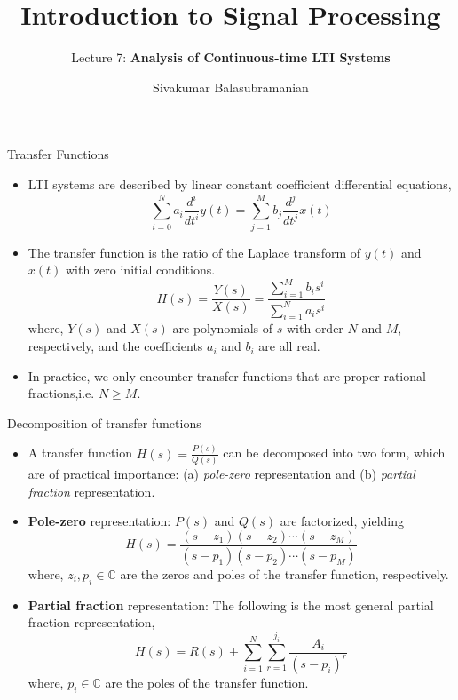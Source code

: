 \documentclass{beamer}
\title{Introduction to Signal Processing}
\subtitle{Lecture 7: \textbf{Analysis of Continuous-time LTI Systems}}
\author{Sivakumar Balasubramanian}
\institute[Christian Medical College] %
{
  \inst{}%
  Department of Bioengineering\\
  Christian Medical College, Bagayam\\
  Vellore 632002
}
\date{}
\begin{document}

\begin{frame}
  \titlepage
\end{frame}

\begin{frame}{Transfer Functions}

\begin{itemize}
\item LTI systems are described by linear constant coefficient differential equations,
\[ \sum_{i=0}^{N}a_i\frac{d^i}{dt^i}y(t) = \sum_{j=1}^{M}b_{j}\frac{d^j}{dt^j}x(t) \]
\item The transfer function is the ratio of the Laplace transform of $y(t)$ and $x(t)$ with zero initial conditions.
\[ H(s) = \frac{Y(s)}{X(s)} = \frac{\sum_{i=1}^{M}b_is^i}{\sum_{i=1}^{N}a_is^i} \]
where, $Y(s)$ and $X(s)$ are polynomials of $s$ with order $N$ and $M$, respectively, and the coefficients $a_i$ and $b_i$ are all real.
\item In practice, we only encounter transfer functions that are proper rational fractions,i.e. $N \geq M$.
\end{itemize}
\end{frame}

\begin{frame}{Decomposition of transfer functions}

\begin{itemize}
\item A transfer function $H(s)=\frac{P(s)}{Q(s)}$ can be  decomposed into two form, which are of practical importance: (a) \textit{pole-zero} representation and (b) \textit{partial fraction} representation.

\item \textbf{Pole-zero} representation: $P(s)$ and $Q(s)$ are factorized, yielding
\[ H(s) = \frac{\left(s-z_1\right)\left(s-z_2\right)\cdots\left(s-z_M\right)}{\left(s-p_1\right)\left(s-p_2\right)\cdots\left(s-p_M\right)} \]
where, $z_i,p_i \in \mathbb{C}$ are the zeros and poles of the transfer function, respectively.

\item \textbf{Partial fraction} representation: The following is the most general partial fraction representation,
\[ H(s) = R(s) + \sum_{i=1}^{N}\sum_{r=1}^{j_i}\frac{A_i}{\left(s-p_i\right)^r} \]
where, $p_i \in \mathbb{C}$ are the poles of the transfer function.
\end{itemize}
\end{frame}
\end{document}
